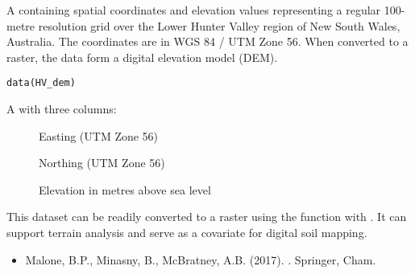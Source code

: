 \documentclass[a4paper]{book}
\begin{document}
%
\begin{Examples}
\end{Examples}
%
\begin{Description}
A  containing spatial coordinates and elevation values representing a regular 100-metre resolution grid over the Lower Hunter Valley region of New South Wales, Australia. The coordinates are in WGS 84 / UTM Zone 56. When converted to a raster, the data form a digital elevation model (DEM).
\end{Description}
%
\begin{Usage}
\begin{verbatim}
data(HV_dem)
\end{verbatim}
\end{Usage}
%
\begin{Format}
A  with three columns:
\begin{description}

\item[] Easting (UTM Zone 56)
\item[] Northing (UTM Zone 56)
\item[] Elevation in metres above sea level

\end{description}

\end{Format}
%
\begin{Details}
This dataset can be readily converted to a raster using the  function with . It can support terrain analysis and serve as a covariate for digital soil mapping.
\end{Details}
%
\begin{References}
\begin{itemize}

\item{} Malone, B.P., Minasny, B., McBratney, A.B. (2017). . Springer, Cham.

\end{itemize}

\end{References}
\end{document}
